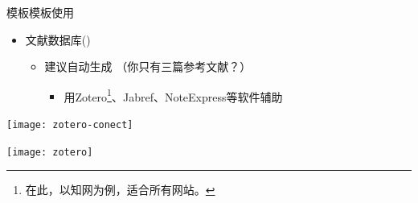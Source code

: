 \documentclass[fontset = adobe, xcolor=svgnames, t, aspectratio=169]{ctexbeamer}
\begin{document}

\begin{frame}{\nwafuthesis 模板}{模板使用}
  \begin{itemize}
  \item 文献数据库()
    \begin{itemize}
    \item 建议自动生成 （你只有三篇参考文献？）

      \begin{itemize}
      \item 用Zotero\footnote[frame,1]{在此，以知网为例，适合所有网站。}、Jabref、NoteExpress等软件辅助
      \end{itemize}
      
    \end{itemize}
  \end{itemize}
  \centering
  \vspace{6ex}
  \begin{annotatedFigure}
    {\texttt{[image: zotero-conect]}}
  \end{annotatedFigure}\quad%
  \begin{annotatedFigure}
    {\texttt{[image: zotero]}}
  \end{annotatedFigure}
\end{frame}
\end{document}
